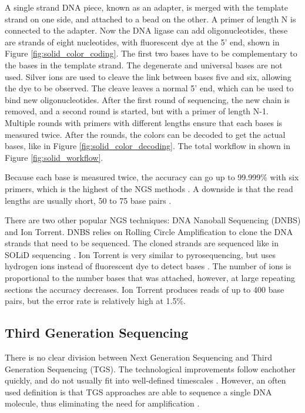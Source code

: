 \documentclass[../main/thesis.tex]{subfiles}
\begin{document}
A single strand DNA piece, known as an adapter, is merged with the template strand on one side, and attached to a bead on the other.
A primer of length N is connected to the adapter.
Now the DNA ligase can add oligonucleotides, these are strands of eight nucleotides, with fluorescent dye at the 5' end, shown in Figure \ref{fig:solid_color_coding}.
The first two bases have to be complementary to the bases in the template strand.
The degenerate and universal bases are not used.
Silver ions are used to cleave the link between bases five and six, allowing the dye to be observed.
The cleave leaves a normal 5' end, which can be used to bind new oligonucleotides.
After the first round of sequencing, the new chain is removed, and a second round is started, but with a primer of length N-1.
Multiple rounds with primers with different lengths ensure that each bases is measured twice.
After the rounds, the colors can be decoded to get the actual bases, like in Figure \ref{fig:solid_color_decoding}.
The total workflow in shown in Figure \ref{fig:solid_workflow}.

Because each base is measured twice, the accuracy can go up to 99.999\% with six primers, which is the highest of the NGS methods \cite{ngs_sequencing_atdbio}.
A downside is that the read lengths are usually short, 50 to 75 base pairs \cite{ngs_history}.


There are two other popular NGS techniques: DNA Nanoball Sequencing (DNBS) and Ion Torrent.
DNBS relies on Rolling Circle Amplification to clone the DNA strands that need to be sequenced.
The cloned strands are sequenced like in SOLiD sequencing \cite{ngs_history}.
Ion Torrent is very similar to pyrosequencing, but uses hydrogen ions instead of fluorescent dye to detect bases \cite{ngs_sequencing_atdbio}.
The number of ions is proportional to the number bases that was attached, however, at large repeating sections the accuracy decreases.
Ion Torrent produces reads of up to 400 base pairs, but the error rate is relatively high at 1.5\%.


\subsection{Third Generation Sequencing}
There is no clear division between Next Generation Sequencing and Third Generation Sequencing (TGS).
The technological improvements follow eachother quickly, and do not usually fit into well-defined timescales \cite{window_tgs}.
However, an often used definition is that TGS approaches are able to sequence a single DNA molecule, thus eliminating the need for amplification \cite{history_sequencing}\cite{ngs_sequencing_atdbio}.
\end{document}
